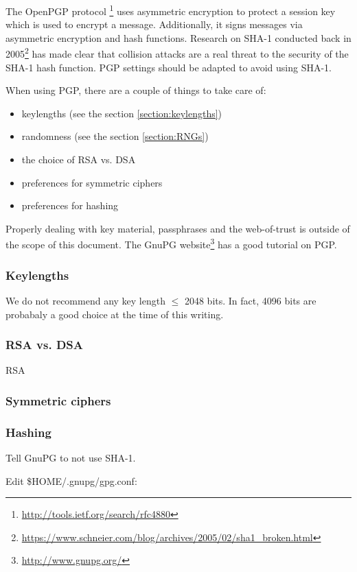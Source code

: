 
The OpenPGP protocol
\footnote{\url{http://tools.ietf.org/search/rfc4880}}
 uses asymmetric encryption to protect a session key which is used to encrypt a message. Additionally, it signs messages via asymmetric encryption and hash functions. %
Research on SHA-1 conducted back in 2005\footnote{\url{https://www.schneier.com/blog/archives/2005/02/sha1\_broken.html}} has made clear that collision attacks are a real threat to the security of the SHA-1 hash function. PGP settings should be adapted to avoid using SHA-1.


When using PGP, there are a couple of things to take care of:
\begin{itemize}
\item keylengths (see the section \ref{section:keylengths})
\item randomness (see the section \ref{section:RNGs})
\item the choice of RSA vs. DSA 
\item preferences for symmetric ciphers
\item preferences for hashing
\end{itemize}

Properly dealing with key material, passphrases and the web-of-trust is outside of the scope of this document. The GnuPG website\footnote{\url{http://www.gnupg.org/}} has a good tutorial on PGP.

\subsubsection{Keylengths}
We do not recommend any key length $\le$ 2048 bits. In fact, 4096 bits are probabaly a good choice at the time of this writing.

\subsubsection{RSA vs. DSA}
RSA%

\subsubsection{Symmetric ciphers}


\subsubsection{Hashing}
Tell GnuPG to not use SHA-1.

Edit \$HOME/.gnupg/gpg.conf:


